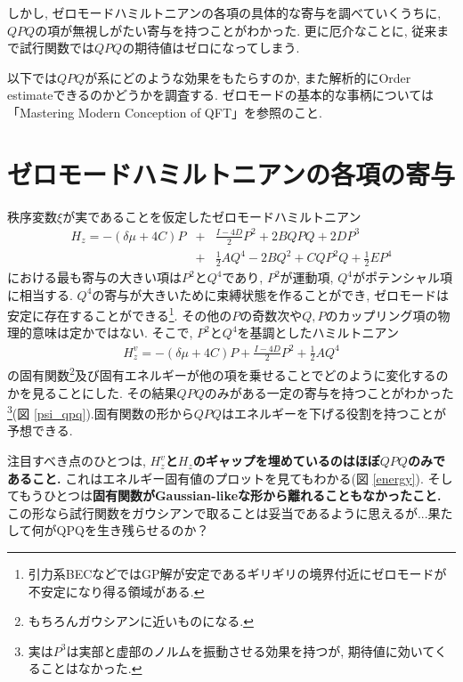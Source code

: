 \documentclass[10.5pt,a4paper]{jreport}
\begin{document}
しかし, ゼロモードハミルトニアンの各項の具体的な寄与を調べていくうちに, $QPQ$の項が無視しがたい寄与を持つことがわかった. 更に厄介なことに, 従来まで試行関数では$QPQ$の期待値はゼロになってしまう.

以下では$QPQ$が系にどのような効果をもたらすのか, また解析的にOrder estimateできるのかどうかを調査する. ゼロモードの基本的な事柄については「Mastering Modern Conception of QFT」を参照のこと.

\section{ゼロモードハミルトニアンの各項の寄与}
秩序変数$\xi$が実であることを仮定したゼロモードハミルトニアン
\begin{eqnarray}
  \nonumber  H_z = -(\delta\mu + 4C)P &+& \frac{I-4D}{2}P^2 + 2BQPQ + 2DP^3\\
  &+& \frac{1}{2}AQ^4 -2BQ^2 + CQP^2Q + \frac{1}{2}EP^4
\end{eqnarray}
における最も寄与の大きい項は$P^2$と$Q^4$であり, $P^2$が運動項, $Q^4$がポテンシャル項に相当する. $Q^4$の寄与が大きいために束縛状態を作ることができ, ゼロモードは安定に存在することができる\footnote{引力系BECなどではGP解が安定であるギリギリの境界付近にゼロモードが不安定になり得る領域がある.}. その他の$P$の奇数次や$Q, P$のカップリング項の物理的意味は定かではない. そこで, $P^2$と$Q^4$を基調としたハミルトニアン
\begin{eqnarray}
  \nonumber  H_z^v = -(\delta\mu + 4C)P + \frac{I-4D}{2}P^2 + \frac{1}{2}AQ^4
\end{eqnarray}
の固有関数\footnote{もちろんガウシアンに近いものになる.}及び固有エネルギーが他の項を乗せることでどのように変化するのかを見ることにした. その結果$QPQ$のみがある一定の寄与を持つことがわかった\footnote{実は$P^3$は実部と虚部のノルムを振動させる効果を持つが, 期待値に効いてくることはなかった. }(図 \ref{psi_qpq}).固有関数の形から$QPQ$はエネルギーを下げる役割を持つことが予想できる.

注目すべき点のひとつは, \textbf{$H_z^v$と$H_z$のギャップを埋めているのはほぼ$QPQ$のみであること.} これはエネルギー固有値のプロットを見てもわかる(図 \ref{energy}). そしてもうひとつは\textbf{固有関数がGaussian-likeな形から離れることもなかったこと.} この形なら試行関数をガウシアンで取ることは妥当であるように思えるが...果たして何がQPQを生き残らせるのか？
\end{document}
